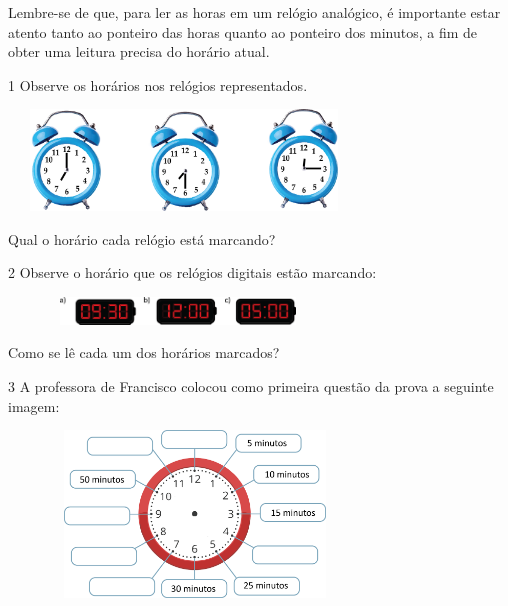 \begin{escolha}
{Lembre-se de que, para ler as horas em um relógio analógico, é importante estar atento tanto ao ponteiro das horas quanto ao ponteiro dos minutos, a fim de obter uma leitura precisa do horário atual.}


\num{1} Observe os horários nos relógios representados.


\includegraphics[width=3.66698in,height=1.05843in]{media/image51.png}

Qual o horário cada relógio está marcando?


\num{2} Observe o horário que os relógios digitais estão marcando:


\includegraphics[width=3.54197in,height=0.29169in]{media/image52.png}

Como se lê cada um dos horários marcados?


\num{3} A professora de Francisco colocou como primeira questão da prova a seguinte imagem:


\includegraphics[width=3.90034in,height=1.75015in]{media/image53.png}


\end{escolha}
